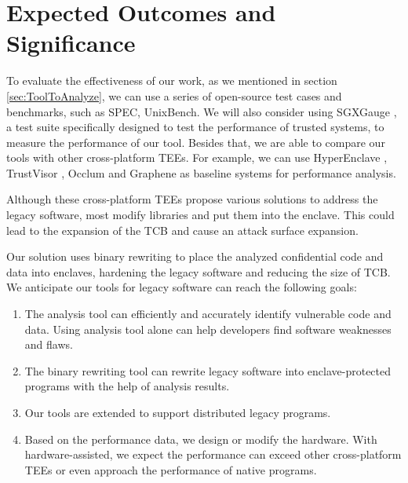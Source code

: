 \section{Expected Outcomes and Significance}
To evaluate the effectiveness of our work, as we mentioned in section
\ref{sec:ToolToAnalyze}, we can use a series of open-source test cases and benchmarks,
such as SPEC, UnixBench.
We will also consider using SGXGauge \cite{Kumar2022ACB}, a test suite specifically
designed to test the performance of trusted systems, to measure the performance
of our tool.
Besides that, we are able to compare our tools with other cross-platform TEEs.
For example, we can use HyperEnclave \cite{Jia2022HyperEnclaveAO}, TrustVisor
\cite{McCune2010TrustVisorET}, Occlum \cite{Shen2020OcclumSA} and Graphene
\cite{Tsai2017GrapheneSGXAP} as baseline systems for performance analysis.

Although these cross-platform TEEs propose various solutions to address the
legacy software, most modify libraries and put them into the enclave.
This could lead to the expansion of the TCB and cause  an attack surface expansion.

Our solution uses binary rewriting to place the analyzed confidential code and data
into enclaves, hardening the legacy software and reducing the size of TCB.
We anticipate our tools for legacy software can reach the following goals:
\begin{enumerate}
    \item The analysis tool can efficiently and accurately identify vulnerable code and data.
    Using analysis tool alone can help developers find software weaknesses and flaws.
    \item The binary rewriting tool can rewrite legacy software into enclave-protected programs
    with the help of analysis results.
    \item Our tools are extended to support distributed legacy programs.
    \item Based on the performance data, we design or modify the hardware.
    With hardware-assisted, we expect the performance can exceed other cross-platform TEEs
    or even approach the performance of native programs.
\end{enumerate}